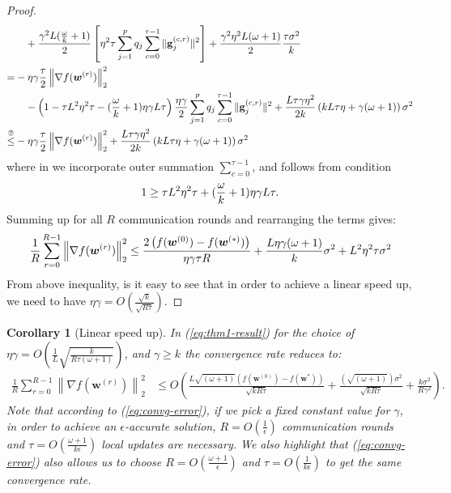\documentclass{article}
\newtheorem{corollary}{Corollary}
\begin{document}
\begin{proof}
\begin{align}
     &\quad+\frac{\gamma^2 L(\frac{\omega}{k}+1)}{2}\left[{\eta^2\tau}\sum_{j=1}^pq_j\sum_{c=0}^{\tau-1}\|\mathbf{g}^{(c,r)}_{j}\|^2\right]+\frac{\gamma^2\eta^2 L(\omega+1)}{2}\frac{\tau \sigma^2}{k}\nonumber\\
     =&-\eta\gamma\frac{\tau}{2}\left\|\nabla f({\boldsymbol{w}}^{(r)})\right\|_2^2\nonumber\\
     &\quad-\left(1-{\tau L^2\eta^2\tau}-{(\frac{\omega}{k}+1)\eta\gamma L}{\tau}\right)\frac{\eta\gamma}{2}\sum_{j=1}^pq_j\sum_{c=0}^{\tau-1}\|\mathbf{g}^{(c,r)}_{j}\|^2+\frac{L\tau\gamma\eta^2 }{2k}\left(kL\tau\eta+\gamma(\omega+1)\right)\sigma^2\nonumber\\
     \stackrel{\text{\ding{193}}}{\leq}& -\eta\gamma\frac{\tau}{2}\left\|\nabla f({\boldsymbol{w}}^{(r)})\right\|_2^2+\frac{L\tau\gamma\eta^2 }{2k}\left(kL\tau\eta+\gamma(\omega+1)\right)\sigma^2\label{eq:finalll}
\end{align}
where in  we incorporate outer summation $\sum_{c=0}^{\tau-1}$, and   follows from condition 
\begin{align}\notag
   1\geq {\tau L^2\eta^2\tau}+(\frac{\omega}{k}+1)\eta\gamma L{\tau}. 
\end{align}
Summing up for all $R$ communication rounds and  rearranging the terms gives:
\begin{align}\notag
    \frac{1}{R}\sum_{r=0}^{R-1}\left\|\nabla f({\boldsymbol{w}}^{(r)})\right\|_2^2\leq \frac{2\left(f(\boldsymbol{w}^{(0)})-f(\boldsymbol{w}^{(*)})\right)}{\eta\gamma\tau R}+\frac{L\eta\gamma{(\omega+1)}}{k}\sigma^2+{L^2\eta^2\tau }\sigma^2
\end{align}
From above inequality, is it easy to see that in order to achieve a linear speed up, we need to have $\eta\gamma=O\left(\frac{\sqrt{k}}{\sqrt{R \tau}}\right)$.
\end{proof}


\begin{corollary}[Linear speed up] 
In (\ref{eq:thm1-result}) for the choice of  $\eta\gamma=O\left(\frac{1}{L}\sqrt{\frac{k}{R\tau\left(\omega+1\right)}}\right)$, and $\gamma\geq k$  the  convergence rate reduces to:
\begin{align}
    \frac{1}{R}\sum_{r=0}^{R-1}\left\|\nabla f({\boldsymbol{w}}^{(r)})\right\|_2^2&\leq O\left(\frac{L\sqrt{\left(\omega+1\right)}\left(f(\boldsymbol{w}^{(0)})-f(\boldsymbol{w}^{*})\right)}{\sqrt{kR\tau}}+\frac{\left(\sqrt{\left(\omega+1\right)}\right)\sigma^2}{\sqrt{kR\tau}}+\frac{k\sigma^2}{R\gamma^2}\right).\label{eq:convg-error}
\end{align}
Note that according to (\ref{eq:convg-error}), if we pick  a fixed constant value for  $\gamma$, in order to achieve an $\epsilon$-accurate solution, $R=O\left(\frac{1}{\epsilon}\right)$ communication rounds and $\tau=O\left(\frac{\omega+1}{k\epsilon}\right)$ local updates are necessary. We also highlight  that (\ref{eq:convg-error}) also allows us to choose $R=O\left(\frac{\omega+1}{\epsilon}\right)$ and $\tau=O\left(\frac{1}{k\epsilon}\right)$ to get the  same convergence rate.
\end{corollary}
\end{document}
